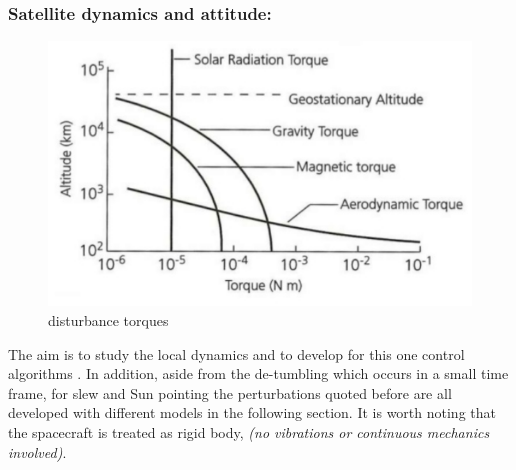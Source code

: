 \documentclass[11pt]{article}
\begin{document}
\subsubsection{Satellite dynamics and attitude:}
\begin{figure} [H]
\centering 
\includegraphics[scale=0.70]{torquessss.PNG}
\caption{ disturbance torques
\cite{perturbationss}}
\end{figure}
The aim is to study the local dynamics and to develop for this one control algorithms . In addition, aside from the de-tumbling which occurs in a small time frame, for slew and Sun pointing the perturbations quoted before are all developed with different models in the following section. It is worth noting that the spacecraft is treated as rigid body, \textit{(no vibrations or continuous mechanics involved)}. 
\end{document}
